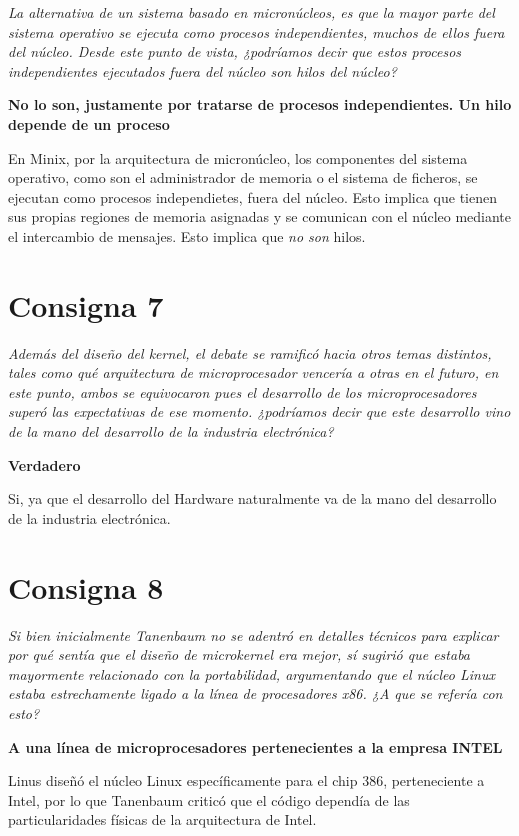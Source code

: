 \documentclass[11pt]{article}
\begin{document}
\emph{La alternativa de un sistema basado en micronúcleos, es que la mayor parte
del sistema operativo se ejecuta como procesos independientes, muchos de ellos
fuera del núcleo.  Desde este punto de vista, ¿podríamos decir que estos
procesos independientes ejecutados fuera del núcleo son hilos del núcleo?  }

\textbf{No lo son, justamente por tratarse de procesos independientes. Un hilo
depende de un proceso}

En Minix, por la arquitectura de micronúcleo, los componentes del sistema
operativo, como son el administrador de memoria o el sistema de ficheros, se 
ejecutan como procesos independietes, fuera del núcleo. Esto implica que tienen
sus propias regiones de memoria asignadas y se comunican con el núcleo mediante 
el intercambio de mensajes. Esto implica que \emph{no son} hilos.

\section*{Consigna 7}

\emph{Además del diseño del kernel, el debate se ramificó hacia otros temas
distintos, tales como qué arquitectura de microprocesador vencería a otras en el
futuro, en este punto, ambos se equivocaron pues el desarrollo de los
microprocesadores superó las expectativas de ese momento. ¿podríamos decir que
este desarrollo vino de la mano del desarrollo de la industria electrónica?}

\textbf{Verdadero}

Si, ya que el desarrollo del Hardware naturalmente va de la mano del desarrollo 
de la industria electrónica.

\section*{Consigna 8}

\emph{Si bien inicialmente Tanenbaum no se adentró en detalles técnicos para
explicar por qué sentía que el diseño de microkernel era mejor, sí sugirió que
estaba mayormente relacionado con la portabilidad, argumentando que el núcleo
Linux estaba estrechamente ligado a la línea de procesadores x86. ¿A que se
refería con esto?}

\textbf{A una línea de microprocesadores pertenecientes a la empresa INTEL}

Linus diseñó el núcleo Linux específicamente para el chip 386, perteneciente a 
Intel, por lo que Tanenbaum criticó que el código dependía de las
particularidades físicas de la arquitectura de Intel. 
\end{document}
